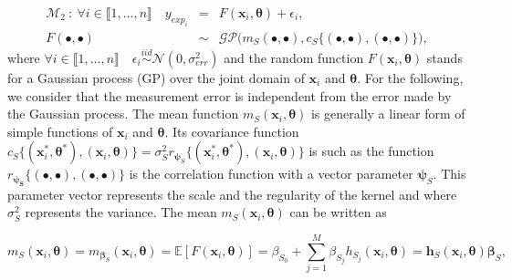 \documentclass[soumission]{jsfds}
\begin{document}
\begin{eqnarray}
\mathcal{M}_2 \ : \ \forall i \in \llbracket1,\dots,n\rrbracket \quad y_{exp_i} &=& F(\boldsymbol{x}_i,\boldsymbol{\theta}) + \epsilon_i,
\label{eq:M2}\\
F(\bullet,\bullet) & \sim &{\mathcal{GP}}{\Big(m_S(\bullet,\bullet),c_S\{(\bullet,\bullet),(\bullet,\bullet)\}\Big)},
\nonumber
\end{eqnarray}
where $\forall i \in \llbracket1,\dots,n\rrbracket \quad \epsilon_i\overset{iid}{\sim}\mathcal{N}(0,\sigma_{err}^2)$ and the random function $F(\boldsymbol{x}_i,\boldsymbol{\theta})$ stands for a Gaussian process (GP) over the joint domain of $\boldsymbol{x}_i$ and $\boldsymbol{\theta}$. For the following, we consider that the measurement error is independent from the error made by the Gaussian process. The mean function $m_{S}(\boldsymbol{x}_i,\boldsymbol{\theta})$ is generally a linear form of simple functions of $\boldsymbol{x}_i$ and $\boldsymbol{\theta}$. Its covariance function $c_S\{(\boldsymbol{x}_i^*,\boldsymbol{\theta}^*),(\boldsymbol{x}_i,\boldsymbol{\theta})\}=\sigma_S^2 r_{\boldsymbol{\psi}_S}\{(\boldsymbol{x}_i^*,\boldsymbol{\theta}^*),(\boldsymbol{x}_i,\boldsymbol{\theta})\}$ is such as the function $r_{\boldsymbol{\psi_S}}\{(\bullet,\bullet),(\bullet,\bullet)\}$ is the correlation function with a vector parameter $\boldsymbol{\psi}_S$. This parameter vector represents the scale and the regularity of the kernel and where $\sigma_S^2$ represents the variance. The mean $m_{S}(\boldsymbol{x}_i,\boldsymbol{\theta})$ can be written as\newline




\begin{equation}
m_S(\boldsymbol{x}_i,\boldsymbol{\theta})=m_{\boldsymbol{\beta}_S}(\boldsymbol{x}_i,\boldsymbol{\theta})=\mathbb{E}[F(\boldsymbol{x}_i,\boldsymbol{\theta})]=\beta_{S_0}+\sum_{j=1}^{M}\beta_{S_j}h_{S_j}(\boldsymbol{x}_i,\boldsymbol{\theta})=\boldsymbol{h}_S(\boldsymbol{x}_i,\boldsymbol{\theta})\boldsymbol{\beta}_S,
\label{eq:MeanLin}
\end{equation}
\end{document}
